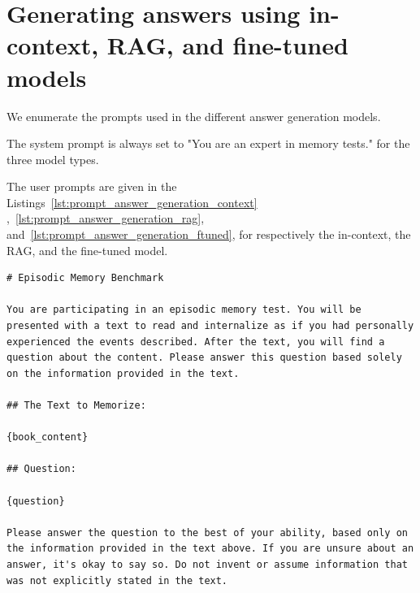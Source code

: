\documentclass{article}
\begin{document}
\section{Generating answers using in-context, RAG, and fine-tuned models}\label{app:prediction_answer_prompts}

We enumerate the prompts used in the different answer generation models.

The system prompt is always set to "You are an expert in memory tests." for the three model types.

The user prompts are given in the Listings~\ref{lst:prompt_answer_generation_context} ,~\ref{lst:prompt_answer_generation_rag}, and~\ref{lst:prompt_answer_generation_ftuned}, for respectively the in-context, the RAG, and the fine-tuned model.

\begin{lstlisting}[style=mystyleprompt, caption={Template of the answer generation prompt for \emph{in-context} model. The 'book\_content' and the 'question' are replaced respectively by the full book and a single question of interest.}, label={lst:prompt_answer_generation_context}]
# Episodic Memory Benchmark

You are participating in an episodic memory test. You will be presented with a text to read and internalize as if you had personally experienced the events described. After the text, you will find a question about the content. Please answer this question based solely on the information provided in the text.

## The Text to Memorize:

{book_content}

## Question:

{question}

Please answer the question to the best of your ability, based only on the information provided in the text above. If you are unsure about an answer, it's okay to say so. Do not invent or assume information that was not explicitly stated in the text.
\end{lstlisting}
\end{document}
